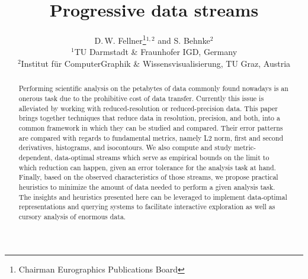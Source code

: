 \documentclass{egpubl}
\title[EG \LaTeX\ Author Guidelines]%
{Progressive data streams}
\author[D. Fellner \& S. Behnke]
{D.\,W. Fellner\thanks{Chairman Eurographics Publications Board}$^{1,2}$
  and S. Behnke$^{2}$
  \\
  $^1$TU Darmstadt \& Fraunhofer IGD, Germany\\
  $^2$Institut f{\"u}r ComputerGraphik \& Wissensvisualisierung, TU Graz, Austria
}
\begin{document}
  

\maketitle

\begin{abstract}
Performing scientific analysis on the petabytes of data commonly found nowadays is an onerous task
due to the prohibitive cost of data transfer. Currently this issue is alleviated by working with
reduced-resolution or reduced-precision data. This paper brings together techniques that reduce data
in resolution, precision, and both, into a common framework in which they can be studied and
compared. Their error patterns are compared with regards to fundamental metrics, namely L2 norm,
first and second derivatives, histograms, and isocontours. We also compute and study
metric-dependent, data-optimal streams which serve as empirical bounds on the limit to which
reduction can happen, given an error tolerance for the analysis task at hand. Finally, based on the
observed characteristics of those streams, we propose practical heuristics to minimize the amount of
data needed to perform a given analysis task. The insights and heuristics presented here can be
leveraged to implement data-optimal representations and querying systems to facilitate interactive
exploration as well as cursory analysis of enormous data.  
\begin{classification} %
\end{classification}
  
\end{abstract}

%






\end{document}
